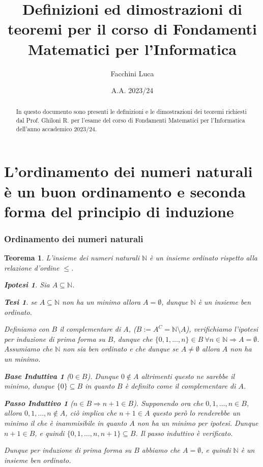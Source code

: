 \documentclass{article}
\title{Definizioni ed dimostrazioni di teoremi per il corso di Fondamenti Matematici per l'Informatica}
\author{Facchini Luca}
\date{A.A. 2023/24}
\makeatletter
\renewenvironment{proof}[1][\proofname]{\par
    \pushQED{\qed}%
    \normalfont \topsep6\p@\@plus6\p@\relax
    \trivlist
    \item\relax
    {\itshape
    #1\@addpunct{.}}\hspace\labelsep\ignorespaces
    }{%
    \popQED\endtrivlist\@endpefalse
}
\newtheorem{theorem}{Teorema}[part]
\newtheorem{ipothesis}[lemma]{Ipotesi}
\newtheorem{thesis}[lemma]{Tesi}
\theoremstyle{definition}
\newtheorem*{base}{Base Induttiva}
\newtheorem*{step}{Passo Induttivo}
\makeatother
\begin{document}
\maketitle
\begin{abstract}
    In questo documento sono presenti le definizioni e le dimostrazioni dei teoremi richiesti dal Prof. Ghiloni R. per l'esame del corso di Fondamenti Matematici per l'Informatica dell'anno accademico 2023/24.
\end{abstract}
\tableofcontents
\pagebreak
\part[Ordinamento numeri naturali e seconda forma induzione]{L’ordinamento dei numeri naturali è un buon ordinamento e seconda forma del principio di induzione}
    \section{Ordinamento dei numeri naturali}
        \begin{theorem}
            L'insieme dei numeri naturali $\mathbb{N}$ è un insieme ordinato rispetto alla relazione d'ordine $\leq$.
            \begin{ipothesis}
                Sia \(A \subseteq \mathbb{N}\).
            \end{ipothesis}
            \begin{thesis}
                se \(A \subseteq \mathbb{N}\) non ha un minimo allora \(A=\emptyset\), dunque \(\mathbb{N}\) è un insieme ben ordinato.
            \end{thesis}
            \begin{proof}
                Definiamo con \(B\) il complementare di \(A\), (\(B:=A^C=\mathbb{N}\setminus A\)), verifichiamo l'ipotesi per induzione di prima forma su \(B\), dunque che \(\{0,1,\ldots,n\}\in B\ \forall n\in\mathbb{N}\Rightarrow A = \emptyset\).
                Assumiamo che \(\mathbb{N}\) non sia ben ordinato e che dunque se \(A\neq\emptyset\) allora \(A\) non ha un minimo.
                \begin{base}[$0\in B$]
                    Dunque \(0\notin A\) altrimenti questo ne sarebbe il minimo, dunque \(\{0\}\subseteq B\) in quanto \(B\) è definito come il complementare di \(A\).\checkmark
                \end{base}
                \begin{step}[$n\in B\Rightarrow n+1\in B$]
                    Supponendo ora che \(0,1,\ldots,n\in B\), allora \(0,1,\ldots,n\notin A\), ciò implica che \(n+1\in A\) questo però lo renderebbe un minimo il che è inammisibile in quanto \(A\) non ha un minimo per ipotesi. Dunque \(n+1\in B\), e quindi \(\{0,1,\ldots,n,n+1\}\subseteq B\). Il passo induttivo è verificato.\checkmark
                \end{step}
                Dunque per induzione di prima forma su \(B\) abbiamo che \(A=\emptyset\), e quindi \(\mathbb{N}\) è un insieme ben ordinato.
                \pushQED{}
            \end{proof}
            \raggedleft{\ensuremath{\blacksquare}}
        \end{theorem}
\end{document}
